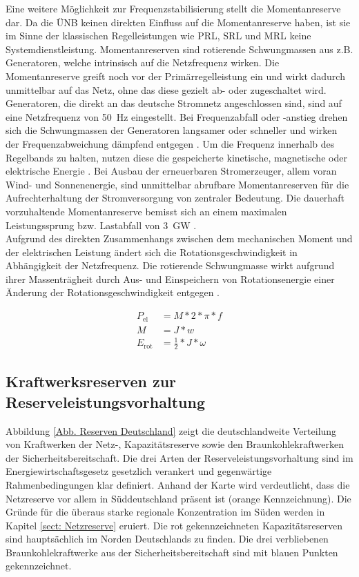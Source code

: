 			Eine weitere Möglichkeit zur Frequenzstabilisierung stellt die Momentanreserve dar.
			Da die ÜNB keinen direkten Einfluss auf die Momentanreserve haben, ist sie im Sinne der klassischen Regelleistungen wie PRL, SRL und MRL keine Systemdienstleistung.
			Momentanreserven sind rotierende Schwungmassen aus z.B. Generatoren, welche intrinsisch auf die Netzfrequenz wirken.
			Die Momentanreserve greift noch vor der Primärregelleistung ein und wirkt dadurch unmittelbar auf das Netz, ohne das diese gezielt ab- oder zugeschaltet wird.
			Generatoren, die direkt an das deutsche Stromnetz angeschlossen sind, sind auf eine Netzfrequenz von \SI{50}{\hertz} eingestellt.
			Bei Frequenzabfall oder -anstieg drehen sich die Schwungmassen der Generatoren langsamer oder schneller und wirken der Frequenzabweichung dämpfend entgegen \cite{Gawlik}.		
			Um die Frequenz innerhalb des Regelbands zu halten, nutzen diese die gespeicherte kinetische, magnetische oder elektrische Energie \cite{Energiespeicher}.
			Bei Ausbau der erneuerbaren Stromerzeuger, allem voran Wind- und Sonnenenergie, sind unmittelbar abrufbare Momentanreserven für die Aufrechterhaltung der Stromversorgung von zentraler Bedeutung.
			Die dauerhaft vorzuhaltende Momentanreserve bemisst sich an einem maximalen Leistungssprung bzw. Lastabfall von \SI{3}{\giga\watt} \cite{Bericht_Momentanreserve}. \\
			
			Aufgrund des direkten Zusammenhangs zwischen dem mechanischen Moment und der elektrischen Leistung ändert sich die Rotationsgeschwindigkeit in Abhängigkeit der Netzfrequenz.
			Die rotierende Schwungmasse wirkt aufgrund ihrer Massenträgheit durch Aus- und Einspeichern von Rotationsenergie einer Änderung der Rotationsgeschwindigkeit entgegen \cite{Bericht_Momentanreserve}.
			
			\begin{align}
				P_\mathrm{el}&=M*\num{2}*\pi*f \\
				M&=J*w \\
				E_\mathrm{rot}&=\frac{\num{1}}{\num{2}}*J*\omega
			\end{align}
		
	\subsection{Kraftwerksreserven zur Reserveleistungsvorhaltung}
	
		Abbildung \ref{Abb. Reserven Deutschland} zeigt die deutschlandweite Verteilung von Kraftwerken der Netz-, Kapazitätsreserve sowie den Braunkohlekraftwerken der Sicherheitsbereitschaft.
		Die drei Arten der Reserveleistungsvorhaltung sind im Energiewirtschaftsgesetz gesetzlich verankert und gegenwärtige Rahmenbedingungen klar definiert.
		Anhand der Karte wird verdeutlicht, dass die Netzreserve vor allem in Süddeutschland präsent ist (orange Kennzeichnung).
		Die Gründe für die überaus starke regionale Konzentration im Süden werden in Kapitel \ref{sect: Netzreserve} eruiert.
		Die rot gekennzeichneten Kapazitätsreserven sind hauptsächlich im Norden Deutschlands zu finden.
		Die drei verbliebenen Braunkohlekraftwerke aus der Sicherheitsbereitschaft sind mit blauen Punkten gekennzeichnet.
		
